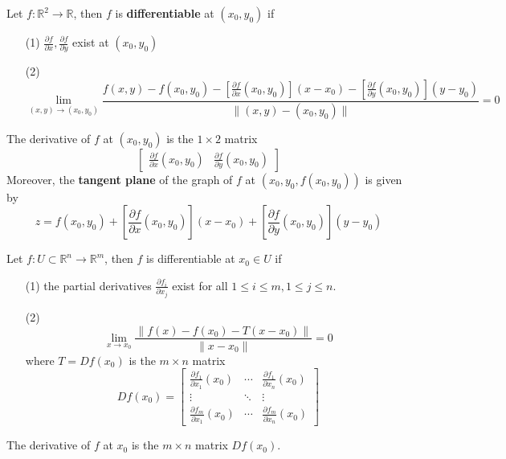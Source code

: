 \documentclass[openany]{book}
\newcommand{\R}{\mathbb{R}}
\begin{document}
\begin{defn}
    Let $f:\R^2\to\R$, then $f$ is \textbf{differentiable} at $(x_0,y_0)$ if 
    \begin{enumerate}
        \item[(1)] $\frac{\partial f}{\partial x},\frac{\partial f}{\partial y}$ exist at $(x_0,y_0)$
        \item[(2)] 
        \begin{equation*}
            \lim_{(x,y)\to(x_0,y_0)}\frac{f(x,y)-f(x_0,y_0)-\left[\frac{\partial f}{\partial x}(x_0,y_0)\right](x-x_0)-\left[\frac{\partial f}{\partial y}(x_0,y_0)\right](y-y_0)}{\|(x,y)-(x_0,y_0)\|}=0
        \end{equation*}
    \end{enumerate}
    The derivative of $f$ at $(x_0,y_0)$ is the $1\times 2$ matrix 
    \begin{equation*}
        \begin{bmatrix}\frac{\partial f}{\partial x}(x_0,y_0)&\frac{\partial f}{\partial y}(x_0,y_0)\end{bmatrix}
    \end{equation*}
    Moreover, the \textbf{tangent plane} of the graph of $f$ at $(x_0,y_0, f(x_0,y_0))$ is given by 
    \begin{equation*}
        z=f(x_0,y_0)+\left[\frac{\partial f}{\partial x}(x_0,y_0)\right](x-x_0)+\left[\frac{\partial f}{\partial y}(x_0,y_0)\right](y-y_0)
    \end{equation*}
\end{defn}

\begin{defn}
    Let $f:U\subset\R^n\to\R^m$, then $f$ is differentiable at $x_0\in U$ if
    \begin{enumerate}
        \item[(1)] the partial derivatives $\frac{\partial f_i}{\partial x_j}$ exist for all $1\leq i\leq m, 1\leq j\leq n$. 
        \item[(2)]
        \begin{equation*}
            \lim_{x\to x_0}\frac{\|f(x)-f(x_0)-T(x-x_0)\|}{\|x-x_0\|}=0
        \end{equation*}
        where $T=Df(x_0)$ is the $m\times n$ matrix 
        \begin{equation*}
            Df(x_0)=
            \begin{bmatrix}
            \frac{\partial f_1}{\partial x_1}(x_0) & \cdots & \frac{\partial f_1}{\partial x_n}(x_0) \\
            \vdots & \ddots & \vdots \\
            \frac{\partial f_m}{\partial x_1}(x_0) & \cdots & \frac{\partial f_m}{\partial x_n}(x_0)
            \end{bmatrix}
        \end{equation*}
    \end{enumerate}
    The derivative of $f$ at $x_0$ is the $m\times n$ matrix $Df(x_0)$.
\end{defn}
\end{document}
